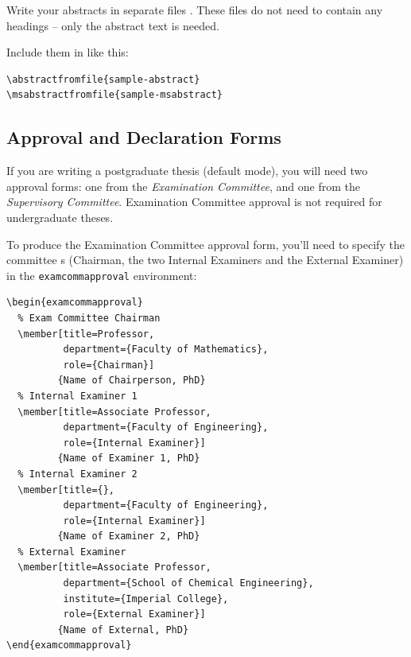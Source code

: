 \documentclass[a4paper,nofonts,raggedright,titlepage,openany]{tufte-book}
\begin{document}
Write your abstracts in separate files . These files do not need to contain any headings -- only the abstract text is needed.

Include them in  like this:
\begin{verbatim}
\abstractfromfile{sample-abstract}
\msabstractfromfile{sample-msabstract}
\end{verbatim}



\subsection{Approval and Declaration Forms}
\label{sec:approval}

If you are writing a postgraduate thesis (default mode), you will need two approval forms: one from the \emph{Examination Committee}, and one from the \emph{Supervisory Committee}. Examination Committee approval is  not required for undergraduate theses.

To produce the Examination Committee approval form, you'll need to specify the committee \texttt{\member}s (Chairman, the two Internal Examiners and the External Examiner) in the \texttt{examcommapproval} environment: 

\begin{verbatim}
\begin{examcommapproval}
  % Exam Committee Chairman
  \member[title=Professor,
          department={Faculty of Mathematics},
          role={Chairman}]
         {Name of Chairperson, PhD}
  % Internal Examiner 1
  \member[title=Associate Professor,
          department={Faculty of Engineering},
          role={Internal Examiner}]
         {Name of Examiner 1, PhD}
  % Internal Examiner 2
  \member[title={},
          department={Faculty of Engineering},
          role={Internal Examiner}]
         {Name of Examiner 2, PhD}
  % External Examiner
  \member[title=Associate Professor,
          department={School of Chemical Engineering},
          institute={Imperial College}, 
          role={External Examiner}]
         {Name of External, PhD}
\end{examcommapproval}
\end{verbatim}
\end{document}
